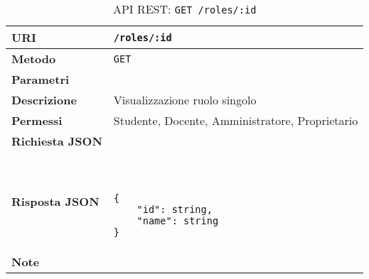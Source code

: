         \begin{table}[H]
            \begin{center}
                \begin{tabular}{p{} p{}}
                    \toprule
                    \textbf{URI} & \texttt{/roles/:id} \\ \midrule
                    \textbf{Metodo} & \texttt{GET} \\ \midrule
                    \textbf{Parametri} & \\ \midrule
                    \textbf{Descrizione} & Visualizzazione ruolo singolo \\ \midrule
                    \textbf{Permessi} & Studente, Docente, Amministratore, Proprietario  \\ \midrule
                    \textbf{Richiesta JSON} & \\ \midrule
                    \textbf{Risposta JSON} & \
                        \begin{lstlisting}[basicstyle={\ttfamily}]
{
    "id": string,
    "name": string
}
                        \end{lstlisting}
                        \\ \midrule
                    \textbf{Note} & \\
                    \bottomrule
                \end{tabular}
                \caption{API REST: \texttt{GET /roles/:id}}
            \end{center}
        \end{table}
